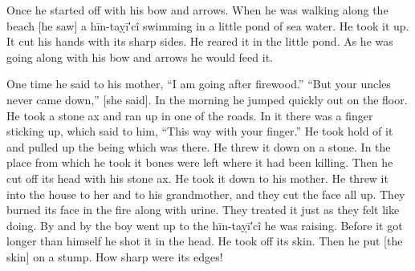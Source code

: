 Once he started off with his bow and arrows.
When he was walking along the beach [he saw] a hīn-taỵī′cî swimming in a little pond of sea water.
He took it up.
It cut his hands with its sharp sides.
He reared it in the little pond.
As he was going along with his bow and arrows he would feed it.

One time he said to his mother,
\qqk{}“I am going after firewood.”
\qqk{}“But your uncles never came down,” [she said].
In the morning he jumped quickly out on the floor.
He took a stone ax
and ran up in one of the roads.
In it there was a finger sticking up,
which said to him,
\qqk{}“This way with your finger.”
He took hold of it and pulled up the being which was there.
He threw it down on a stone.
In the place from which he took it bones were left where it had been killing.
Then he cut off its head with his stone ax.
He took it down to his mother.
He threw it into the house to her
and to his grandmother, and they cut the face all up.
They burned its face in the fire along with urine.
They treated it just as they felt like doing.
By and by the boy went up to the hīn-taỵī′cî he was raising.
Before it got longer than himself he shot it in the head.
He took off its skin.
Then he put [the skin] on a stump.
How sharp were its edges!


